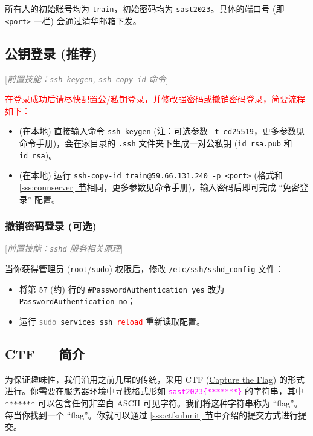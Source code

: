 \documentclass{article}
\begin{document}
	所有人的初始账号均为 \texttt{train}，初始密码均为 \texttt{sast2023}。具体的端口号 (即 \texttt{<port>} 一栏) 会通过清华邮箱下发。

	\subsection{公钥登录 (推荐)}

	\textcolor{gray}{[\textit{前置技能：\texttt{ssh-keygen}, \texttt{ssh-copy-id} 命令}]}

	\textcolor{red}{在登录成功后请尽快配置公/私钥登录，并修改强密码或撤销密码登录，简要流程如下：}

	\begin{itemize}
		\itemsep0pt
		\item (在本地) 直接输入命令 \texttt{ssh-keygen} (注：可选参数 \texttt{-t ed25519}，更多参数见命令手册)，会在家目录的 \texttt{.ssh} 文件夹下生成一对公私钥 (\verb!id_rsa.pub! 和 \verb!id_rsa!)。
		\item (在本地) 运行 \texttt{ssh-copy-id train@59.66.131.240 -p <port>} (格式和 \hyperref[sss:connserver]{\ref*{sss:connserver} 节}相同，更多参数见命令手册)，输入密码后即可完成 ``免密登录'' 配置。
	\end{itemize}

	\subsubsection{撤销密码登录 (可选)}

	\textcolor{gray}{[\textit{前置技能：\texttt{sshd} 服务相关原理}]}

	当你获得管理员 (\texttt{root}/\texttt{sudo}) 权限后，修改 \verb!/etc/ssh/sshd_config! 文件：

	\begin{itemize}
		\itemsep0pt
		\item 将第 57 (约) 行的 \verb!#PasswordAuthentication yes! 改为 \texttt{PasswordAuthentication no}；
		\item 运行 \texttt{\textcolor{gray}{sudo} services ssh \textcolor{red}{reload}} 重新读取配置。
	\end{itemize}

	\subsection{CTF --- 简介}

	为保证趣味性，我们沿用之前几届的传统，采用 CTF (\href{https://en.wikipedia.org/wiki/Capture_the_flag_(cybersecurity)}{Capture the Flag}) 的形式进行。你需要在服务器环境中寻找格式形如 \textcolor{fuchsia}{\texttt{sast2023\{*******\}}} 的字符串，其中 \texttt{*******} 可以包含任何非空白 ASCII 可见字符。我们将这种字符串称为 ``flag''。每当你找到一个 ``flag''。你就可以通过 \hyperref[sss:ctfsubmit]{\ref*{sss:ctfsubmit} 节}中介绍的提交方式进行提交。\cite{sast2022-linux}
\end{document}
